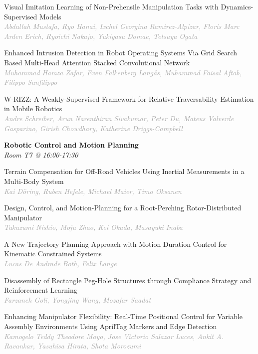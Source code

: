 \begin{multicols*}{2}
\small Visual Imitation Learning of Non-Prehensile Manipulation Tasks with Dynamics-Supervised Models\\ 
\footnotesize \textcolor{darkgray}{\textit{Abdullah Mustafa, Ryo  Hanai, Ixchel Georgina  Ramirez-Alpizar, Floris Marc Arden  Erich, Ryoichi  Nakajo, Yukiyasu  Domae, Tetsuya  Ogata}}

\small Enhanced Intrusion Detection in Robot Operating Systems Via Grid Search Based Multi-Head Attention Stacked Convolutional Network\\ 
\footnotesize \textcolor{darkgray}{\textit{Muhammad Hamza Zafar, Even  Falkenberg Langås, Muhammad Faisal  Aftab, Filippo  Sanfilippo}}

\small W-RIZZ: A Weakly-Supervised Framework for Relative Traversability Estimation in Mobile Robotics\\ 
\footnotesize \textcolor{darkgray}{\textit{Andre Schreiber, Arun Narenthiran  Sivakumar, Peter  Du, Mateus  Valverde Gasparino, Girish  Chowdhary, Katherine  Driggs-Campbell}}

\normalsize \textbf{Robotic Control and Motion Planning}\\
\small \textit{Room T7 @ 16:00-17:30}

\small Terrain Compensation for Off-Road Vehicles Using Inertial Measurements in a Multi-Body System\\ 
\footnotesize \textcolor{darkgray}{\textit{Kai Döring, Ruben  Hefele, Michael  Maier, Timo  Oksanen}}

\small Design, Control, and Motion-Planning for a Root-Perching Rotor-Distributed Manipulator\\ 
\footnotesize \textcolor{darkgray}{\textit{Takuzumi Nishio, Moju  Zhao, Kei  Okada, Masayuki  Inaba}}

\small A New Trajectory Planning Approach with Motion Duration Control for Kinematic Constrained Systems\\ 
\footnotesize \textcolor{darkgray}{\textit{Lucas De Andrade Both, Felix  Lange}}

\small Disassembly of Rectangle Peg-Hole Structures through Compliance Strategy and Reinforcement Learning\\ 
\footnotesize \textcolor{darkgray}{\textit{Farzaneh Goli, Yongjing  Wang, Mozafar  Saadat}}

\small Enhancing Manipulator Flexibility: Real-Time Positional Control for Variable Assembly Environments Using AprilTag Markers and Edge Detection\\ 
\footnotesize \textcolor{darkgray}{\textit{Kamogelo Teddy Theodore Moyo, Jose Victorio  Salazar Luces, Ankit A.  Ravankar, Yasuhisa  Hirata, Shota  Morozumi}}


\end{multicols*}
